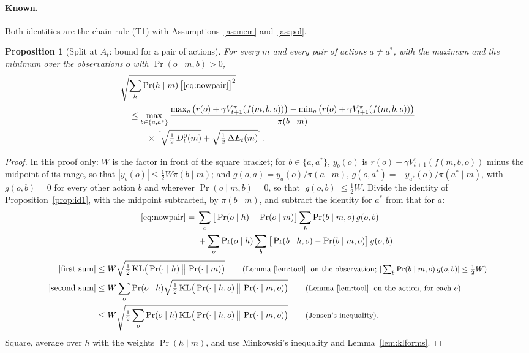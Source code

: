 \documentclass{article}
\newtheorem{proposition}{Proposition}[section]
\theoremstyle{definition}
\newcommand{\KL}{\mathrm{KL}}
\newcommand{\dE}{\Delta E}
\newcommand{\why}[1]{\tag*{\small(#1)}}
\begin{document}
\paragraph{Known.} Both identities are the chain rule (T1) with Assumptions~\ref{as:mem} and~\ref{as:pol}.

\begin{proposition}[Split at $A_t$: bound for a pair of actions]\label{prop:bound1}
For every $m$ and every pair of actions $a\ne a^*$, with the maximum and the minimum over the observations $o$ with $\Pr(o\mid m,b)>0$,
\begin{align*}
&\sqrt{\sum_h\Pr(h\mid m)\,\big[\eqref{eq:nowpair}\big]^2}\\
&\quad\le\max_{b\in\{a,a^*\}}\frac{\max_o\big(r(o)+\gamma V^\pi_{t+1}(f(m,b,o))\big)-\min_o\big(r(o)+\gamma V^\pi_{t+1}(f(m,b,o))\big)}{\pi(b\mid m)}\\
&\qquad\quad\times\Big[\sqrt{\tfrac12\,D^0_t(m)}+\sqrt{\tfrac12\,\dE_t(m)}\Big].
\end{align*}
\end{proposition}

\begin{proof}
In this proof only: $W$ is the factor in front of the square bracket; for $b\in\{a,a^*\}$, $y_b(o)$ is $r(o)+\gamma V^\pi_{t+1}(f(m,b,o))$ minus the midpoint of its range, so that $|y_b(o)|\le\tfrac12W\pi(b\mid m)$; and $g(o,a)=y_a(o)/\pi(a\mid m)$, $g(o,a^*)=-y_{a^*}(o)/\pi(a^*\mid m)$, with $g(o,b)=0$ for every other action $b$ and wherever $\Pr(o\mid m,b)=0$, so that $|g(o,b)|\le\tfrac12W$. Divide the identity of Proposition~\ref{prop:id1}, with the midpoint subtracted, by $\pi(b\mid m)$, and subtract the identity for $a^*$ from that for $a$:
\begin{align*}
\eqref{eq:nowpair}={}&\sum_o\big[\Pr(o\mid h)-\Pr(o\mid m)\big]\sum_b\Pr(b\mid m,o)\,g(o,b)\\
&+\sum_o\Pr(o\mid h)\sum_b\big[\Pr(b\mid h,o)-\Pr(b\mid m,o)\big]\,g(o,b).
\end{align*}
\begin{align*}
|\text{first sum}|&\le W\sqrt{\tfrac12\,\KL\big(\Pr(\cdot\mid h)\,\big\|\,\Pr(\cdot\mid m)\big)} \why{Lemma~\ref{lem:tool}, on the observation; $|\sum_b\Pr(b\mid m,o)\,g(o,b)|\le\tfrac12W$}\\
|\text{second sum}|&\le W\sum_o\Pr(o\mid h)\sqrt{\tfrac12\,\KL\big(\Pr(\cdot\mid h,o)\,\big\|\,\Pr(\cdot\mid m,o)\big)} \why{Lemma~\ref{lem:tool}, on the action, for each $o$}\\
&\le W\sqrt{\tfrac12\sum_o\Pr(o\mid h)\,\KL\big(\Pr(\cdot\mid h,o)\,\big\|\,\Pr(\cdot\mid m,o)\big)} \why{Jensen's inequality}.
\end{align*}
Square, average over $h$ with the weights $\Pr(h\mid m)$, and use Minkowski's inequality and Lemma~\ref{lem:klforms}.
\end{proof}
\end{document}
